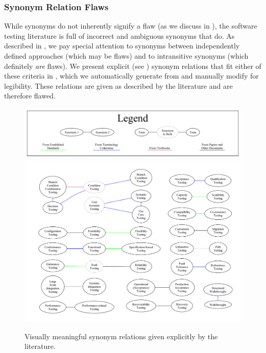 \subsubsection{Synonym Relation Flaws}\label{syns}

While synonyms do not inherently signify a flaw (as we discuss in
), the software testing literature is full of incorrect and
ambiguous synonyms that do. As described in , we pay
special attention to synonyms between independently defined approaches (which
may be flaws) and to intransitive synonyms (which definitely \emph{are} flaws).
\ifnotpaper We present explicit (see ) synonym relations that
    fit either of these criteria in \utd{}, which we
    automatically generate from \ourApproachGlossary{} and manually modify for
    legibility. These relations are given as described by the literature and are
    therefore flawed.

    \begin{figure}[b!]
        \centering
        \includegraphics[width=\textwidth]{assets/graphs/manual/expSynLegend.pdf}
        \includegraphics[width=\textwidth]{assets/graphs/manual/expSynGraph.pdf}
        \caption{Visually meaningful synonym relations given explicitly by the
            literature.}\label{fig:expSynGraph}
    \end{figure}

